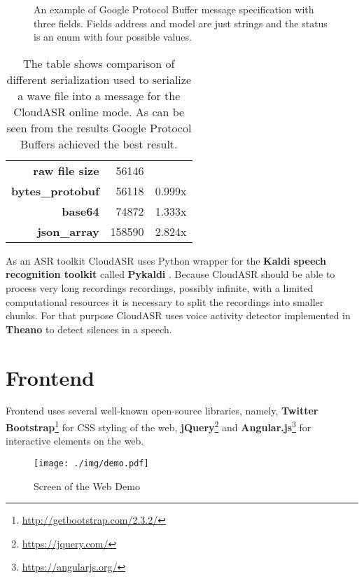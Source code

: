 \begin{figure}[h]
  

  \caption{
    An example of Google Protocol Buffer message specification with three fields.
    Fields address and model are just strings and the status is an enum with four possible values.
  }
  \label{fig:protobuf}
\end{figure}

\begin{table}[h]
  \begin{tabular}{rrl}
  \textbf{raw file size} & 56146 & \\
  \cline{1-3}
  \textbf{bytes\_protobuf} & 56118 & 0.999x \\
  \textbf{base64} & 74872 & 1.333x \\
  \textbf{json\_array} & 158590 & 2.824x \\
  \end{tabular}

  \caption{
    The table shows comparison of different serialization used to serialize a wave file into a message for the CloudASR online mode.
    As can be seen from the results Google Protocol Buffers achieved the best result.
  }
  \label{fig:protobuf-benchmark}
\end{table}

As an ASR toolkit CloudASR uses Python wrapper for the \textbf{Kaldi speech recognition toolkit} \cite{povey2011kaldi} called \textbf{Pykaldi} \cite{platek2014free}.
Because CloudASR should be able to process very long recordings recordings, possibly infinite,
  with a limited computational resources
  it is necessary to split the recordings into smaller chunks.
For that purpose CloudASR uses voice activity detector implemented in \textbf{Theano} \cite{bergstra2010theano} to detect silences in a speech.


\section{Frontend}
Frontend uses several well-known open-source libraries, namely,
  \textbf{Twitter Bootstrap}\footnote{\url{http://getbootstrap.com/2.3.2/}} for CSS styling of the web,
  \textbf{jQuery}\footnote{\url{https://jquery.com/}}
  and \textbf{Angular.js}\footnote{\url{https://angularjs.org/}} for interactive elements on the web.

\begin{figure}[h]
  \centering
  \texttt{[image: ./img/demo.pdf]}

  \caption{Screen of the Web Demo}
  \label{fig:demo}
\end{figure}

